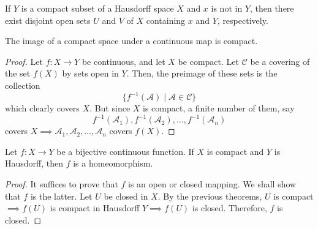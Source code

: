     \begin{lemma}
      If $Y$ is a compact subset of a Hausdorff space $X$ and $x$ is not in $Y$, then there exist disjoint open sets $U$ and $V$ of $X$ containing $x$ and $Y$, respectively. 

      \begin{figure}[H]
        \centering 
        \label{fig:hausdorff_compact}
      \end{figure}
    \end{lemma}


    \begin{theorem}
      The image of a compact space under a continuous map is compact.
    \end{theorem}
    \begin{proof}
      Let $f: X \rightarrow Y$ be continuous, and let $X$ be compact. Let $\mathcal{C}$ be a covering of the set $f(X)$ by sets open in $Y$. Then, the preimage of these sets is the collection
      \begin{equation}
        \{f^{-1}(\mathcal{A}) \; | \; \mathcal{A} \in \mathcal{C}\}
      \end{equation}
      which clearly covers $X$. But since $X$ is compact, a finite number of them, say
      \begin{equation}
        f^{-1} (\mathcal{A}_1), f^{-1} (\mathcal{A}_2), \ldots , f^{-1} (\mathcal{A}_n)
      \end{equation}
      covers $X \implies \mathcal{A}_1, \mathcal{A}_2, \ldots, \mathcal{A}_n$ covers $f(X)$. 
    \end{proof}

    \begin{theorem}
      Let $f: X \rightarrow Y$ be a bijective continuous function. If $X$ is compact and $Y$ is Hausdorff, then $f$ is a homeomorphism. 
    \end{theorem}
    \begin{proof}
      It suffices to prove that $f$ is an open or closed mapping. We shall show that $f$ is the latter. Let $U$ be closed in $X$. By the previous theorems, $U$ is compact $\implies f(U)$ is compact in Hausdorff $Y \implies f(U)$ is closed. Therefore, $f$ is closed. 
    \end{proof}


